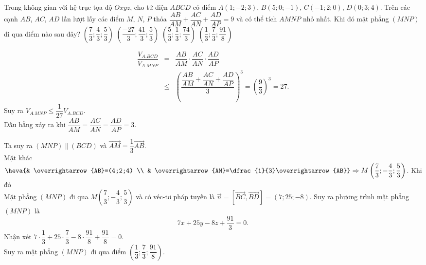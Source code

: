 \begin{ex}%
Trong không gian với hệ trục tọa độ $O x y z$, cho tứ diện $ABCD$ có điểm $A(1;-2;3)$, $B(5;0;-1)$, $C(-1;2;0)$, $D(0;3;4)$. Trên các cạnh $AB$, $AC$, $AD$ lần lượt lấy các điểm $M$, $N$, $P$ thỏa $\dfrac{AB}{AM}+\dfrac{AC}{AN}+\dfrac{AD}{AP}=9$ và có thể tích $AMNP$ nhỏ nhất. Khi đó mặt phẳng $(MNP)$ đi qua điểm nào sau đây?
\choice
{$\left(\dfrac{7}{3};\dfrac{4}{3};\dfrac{5}{3}\right)$}
{$\left(\dfrac{-27}{3};\dfrac{41}{3};\dfrac{5}{3}\right)$}
{$\left(\dfrac{5}{3};\dfrac{1}{3};\dfrac{74}{3}\right)$}
{\True $\left(\dfrac{1}{3};\dfrac{7}{3};\dfrac{91}{8}\right)$}
\loigiai
{
\immini
{
	\begin{eqnarray*}
		\dfrac{V_{A.BCD}}{V_{A.MNP}}&=&\dfrac{AB}{AM}\cdot\dfrac{AC}{AN}\cdot\dfrac{AD}{AP}\\
		&\le&\left(\dfrac{\dfrac{AB}{AM}+\dfrac{AC}{AN}+\dfrac{AD}{AP}}{3}\right)^3=\left(\dfrac{9}{3}\right)^3=27.
	\end{eqnarray*}
Suy ra $V_{A.MNP}\leq\dfrac{1}{27}V_{A.BCD}$.\\
Dấu bằng xảy ra khi $\dfrac{AB}{AM}=\dfrac{AC}{AN}=\dfrac{AD}{AP}=3$.
}
{
}
	\noindent Ta suy ra $(MNP)\parallel (BCD)$ và $\overrightarrow{AM}=\dfrac{1}{3}\overrightarrow{AB}$.\\
	Mặt khác $\heva{& \overrightarrow{AB}=(4;2;4) \\ & \overrightarrow{AM}=\dfrac{1}{3}\overrightarrow{AB}}\Rightarrow M\left(\dfrac{7}{3};-\dfrac{4}{3};\dfrac{5}{3}\right)$. Khi đó\\
	Mặt phẳng $(MNP)$ đi qua $M\left(\dfrac{7}{3};-\dfrac{4}{3};\dfrac{5}{3}\right)$ và có véc-tơ pháp tuyến là $\overrightarrow{n}=[\overrightarrow{BC},\overrightarrow{BD}]=(7;25;-8)$. Suy ra phương trình mặt phẳng $(MNP)$ là
	\[7x+25y-8z+\dfrac{91}{3}=0.\]
	Nhận xét $7\cdot \dfrac{1}{3}+25\cdot \dfrac{7}{3}-8\cdot\dfrac{91}{8}+\dfrac{91}{8}=0$.\\
	Suy ra mặt phẳng $(MNP)$ đi qua điểm $\left(\dfrac{1}{3}; \dfrac{7}{3}; \dfrac{91}{8}\right)$.
}
\end{ex}
